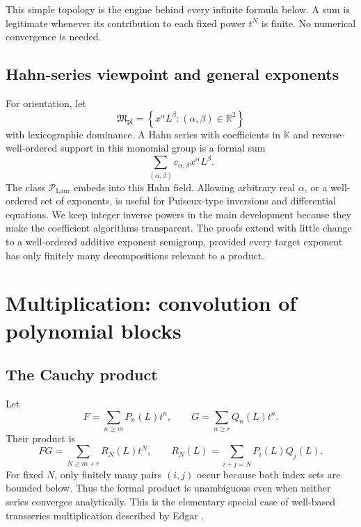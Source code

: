\documentclass[11pt]{article}
\theoremstyle{pltheorem}
\newcommand{\K}{\mathbb K}
\newcommand{\R}{\mathbb R}
\newcommand{\PLL}{\mathscr P_{\mathrm{Laur}}}
\newcommand{\set}[1]{\left\{#1\right\}}
\begin{document}
This simple topology is the engine behind every infinite formula below.  A sum is legitimate whenever its contribution to each fixed power \(t^N\) is finite.  No numerical convergence is needed.

\subsection{Hahn-series viewpoint and general exponents}

For orientation, let
\[
 \mathfrak M_{\mathrm{pl}}=\set{x^\alpha L^\beta:(\alpha,\beta)\in\R^2}
\]
with lexicographic dominance.  A Hahn series with coefficients in \(\K\) and reverse-well-ordered support in this monomial group is a formal sum
\[
 \sum_{(\alpha,\beta)}c_{\alpha,\beta}x^\alpha L^\beta.
\]
The class \(\PLL\) embeds into this Hahn field.  Allowing arbitrary real \(\alpha\), or a well-ordered set of exponents, is useful for Puiseux-type inversions and differential equations.  We keep integer inverse powers in the main development because they make the coefficient algorithms transparent.  The proofs extend with little change to a well-ordered additive exponent semigroup, provided every target exponent has only finitely many decompositions relevant to a product.

\section{Multiplication: convolution of polynomial blocks}
\label{sec:multiplication}

\subsection{The Cauchy product}

Let
\begin{equation}\label{eq:F-G-series}
 F=\sum_{n\ge m}P_n(L)t^n,
 \qquad
 G=\sum_{n\ge r}Q_n(L)t^n.
\end{equation}
Their product is
\begin{equation}\label{eq:Cauchy-product}
 FG=\sum_{N\ge m+r}R_N(L)t^N,
 \qquad
 R_N(L)=\sum_{i+j=N}P_i(L)Q_j(L).
\end{equation}
For fixed \(N\), only finitely many pairs \((i,j)\) occur because both index sets are bounded below.  Thus the formal product is unambiguous even when neither series converges analytically.  This is the elementary special case of well-based transseries multiplication described by Edgar \cite{edgar-beginners}.
\end{document}
